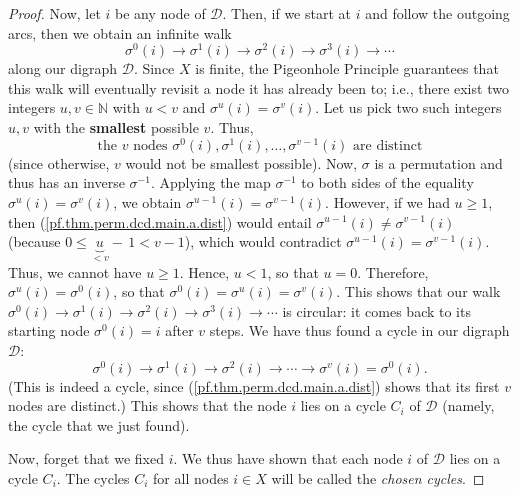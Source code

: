 \begin{proof}
Now, let $i$ be any node of $\mathcal{D}$. Then, if we start at $i$ and follow
the outgoing arcs, then we obtain an infinite walk%
\[
\sigma^{0}\left(  i\right)  \rightarrow\sigma^{1}\left(  i\right)
\rightarrow\sigma^{2}\left(  i\right)  \rightarrow\sigma^{3}\left(  i\right)
\rightarrow\cdots
\]
along our digraph $\mathcal{D}$. Since $X$ is finite, the Pigeonhole Principle
guarantees that this walk will eventually revisit a node it has already been
to; i.e., there exist two integers $u,v\in\mathbb{N}$ with $u<v$ and
$\sigma^{u}\left(  i\right)  =\sigma^{v}\left(  i\right)  $. Let us pick two
such integers $u,v$ with the \textbf{smallest} possible $v$. Thus,
\begin{equation}
\text{the }v\text{ nodes }\sigma^{0}\left(  i\right)  ,\sigma^{1}\left(
i\right)  ,\ldots,\sigma^{v-1}\left(  i\right)  \text{ are distinct}
\label{pf.thm.perm.dcd.main.a.dist}%
\end{equation}
(since otherwise, $v$ would not be smallest possible). Now, $\sigma$ is a
permutation and thus has an inverse $\sigma^{-1}$. Applying the map
$\sigma^{-1}$ to both sides of the equality $\sigma^{u}\left(  i\right)
=\sigma^{v}\left(  i\right)  $, we obtain $\sigma^{u-1}\left(  i\right)
=\sigma^{v-1}\left(  i\right)  $. However, if we had $u\geq1$, then
(\ref{pf.thm.perm.dcd.main.a.dist}) would entail $\sigma^{u-1}\left(
i\right)  \neq\sigma^{v-1}\left(  i\right)  $ (because $0\leq\underbrace{u}%
_{<v}-\,1<v-1$), which would contradict $\sigma^{u-1}\left(  i\right)
=\sigma^{v-1}\left(  i\right)  $. Thus, we cannot have $u\geq1$. Hence, $u<1$,
so that $u=0$. Therefore, $\sigma^{u}\left(  i\right)  =\sigma^{0}\left(
i\right)  $, so that $\sigma^{0}\left(  i\right)  =\sigma^{u}\left(  i\right)
=\sigma^{v}\left(  i\right)  $. This shows that our walk $\sigma^{0}\left(
i\right)  \rightarrow\sigma^{1}\left(  i\right)  \rightarrow\sigma^{2}\left(
i\right)  \rightarrow\sigma^{3}\left(  i\right)  \rightarrow\cdots$ is
circular: it comes back to its starting node $\sigma^{0}\left(  i\right)  =i$
after $v$ steps. We have thus found a cycle in our digraph $\mathcal{D}$:%
\[
\sigma^{0}\left(  i\right)  \rightarrow\sigma^{1}\left(  i\right)
\rightarrow\sigma^{2}\left(  i\right)  \rightarrow\cdots\rightarrow\sigma
^{v}\left(  i\right)  =\sigma^{0}\left(  i\right)  .
\]
(This is indeed a cycle, since (\ref{pf.thm.perm.dcd.main.a.dist}) shows that
its first $v$ nodes are distinct.) This shows that the node $i$ lies on a
cycle $C_{i}$ of $\mathcal{D}$ (namely, the cycle that we just found).

Now, forget that we fixed $i$. We thus have shown that each node $i$ of
$\mathcal{D}$ lies on a cycle $C_{i}$. The cycles $C_{i}$ for all nodes $i\in
X$ will be called the \emph{chosen cycles}.


\end{proof}
